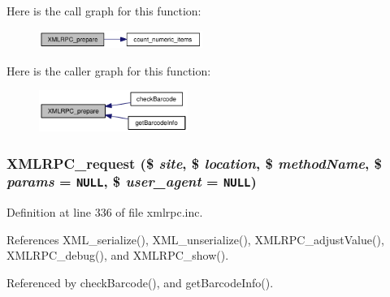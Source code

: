 Here is the call graph for this function:\nopagebreak
\begin{figure}[H]
\begin{center}
\leavevmode
\includegraphics[width=151pt]{xmlrpc_8inc_c13be54b26e0803d8745e4f019dcfd8a_cgraph}
\end{center}
\end{figure}


Here is the caller graph for this function:\nopagebreak
\begin{figure}[H]
\begin{center}
\leavevmode
\includegraphics[width=137pt]{xmlrpc_8inc_c13be54b26e0803d8745e4f019dcfd8a_icgraph}
\end{center}
\end{figure}
\hypertarget{xmlrpc_8inc_3a98b6984b8ca01752d1aa9a267526a3}{
\subsubsection{\setlength{\rightskip}{0pt plus 5cm}XMLRPC\_\-request (\$ {\em site}, \$ {\em location}, \$ {\em methodName}, \$ {\em params} = {\tt NULL}, \$ {\em user\_\-agent} = {\tt NULL})}}
\label{xmlrpc_8inc_3a98b6984b8ca01752d1aa9a267526a3}




Definition at line 336 of file xmlrpc.inc.

References XML\_\-serialize(), XML\_\-unserialize(), XMLRPC\_\-adjustValue(), XMLRPC\_\-debug(), and XMLRPC\_\-show().

Referenced by checkBarcode(), and getBarcodeInfo().

